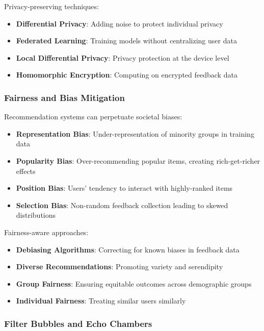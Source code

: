 Privacy-preserving techniques:
\begin{itemize}
    \item \textbf{Differential Privacy}: Adding noise to protect individual privacy
    \item \textbf{Federated Learning}: Training models without centralizing user data
    \item \textbf{Local Differential Privacy}: Privacy protection at the device level
    \item \textbf{Homomorphic Encryption}: Computing on encrypted feedback data
\end{itemize}

\subsubsection{Fairness and Bias Mitigation}

Recommendation systems can perpetuate societal biases:

\begin{itemize}
    \item \textbf{Representation Bias}: Under-representation of minority groups in training data
    \item \textbf{Popularity Bias}: Over-recommending popular items, creating rich-get-richer effects
    \item \textbf{Position Bias}: Users' tendency to interact with highly-ranked items
    \item \textbf{Selection Bias}: Non-random feedback collection leading to skewed distributions
\end{itemize}

Fairness-aware approaches:
\begin{itemize}
    \item \textbf{Debiasing Algorithms}: Correcting for known biases in feedback data
    \item \textbf{Diverse Recommendations}: Promoting variety and serendipity
    \item \textbf{Group Fairness}: Ensuring equitable outcomes across demographic groups
    \item \textbf{Individual Fairness}: Treating similar users similarly
\end{itemize}

\subsubsection{Filter Bubbles and Echo Chambers}

